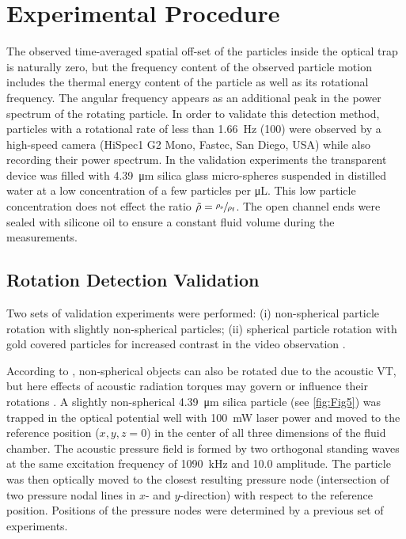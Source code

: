 \section{Experimental Procedure\label{sec:experimentalProcedure}}

The observed time-averaged spatial off-set of the particles inside the optical 
trap is naturally zero, but the frequency content of the observed particle 
motion includes the thermal energy content of the particle as well as its 
rotational frequency. The angular frequency appears as an additional peak in the 
power spectrum of the rotating particle. In order to validate this detection 
method, particles with a rotational rate of less than \SI{1.66}{\hertz} 
(\SI{100}{\rpm}) were observed by a high-speed camera (HiSpec1 G2 Mono, Fastec, 
San Diego, USA) while also recording their power spectrum.  In the validation 
experiments the transparent device was filled with \SI{4.39}{\micro\meter} 
silica glass micro-spheres suspended in distilled water at a low concentration 
of a few particles per \si{\micro\liter}.  This low particle concentration does 
not effect the ratio $\tilde{\rho} = \sfrac{\rho_{\text{s}}}{\rho_{\text{f}}}$. 
The open channel ends were sealed with silicone oil to ensure a constant fluid 
volume during the measurements.

\subsection{Rotation Detection 
Validation\label{sec:rotationDetectionValidation}}

Two sets of validation experiments were performed: (i) non-spherical particle 
rotation with slightly non-spherical particles; (ii) spherical particle rotation 
with gold covered particles for increased contrast in the video observation 
\cite{Lamprecht}. 

According to \citeauthor{hahn2016} \cite{hahn2016}, non-spherical objects can 
also be rotated due to the acoustic VT, but here effects of acoustic radiation 
torques may govern or influence their rotations \cite{wang2012time}. A slightly 
non-spherical \SI{4.39}{\micro\meter} silica particle (see \cref{fig:Fig5}) was 
trapped in the optical potential well with \SI{100}{\milli\watt} laser power and 
moved to the reference position ($x,y,z = 0$) in the center of all three 
dimensions of the fluid chamber. The acoustic pressure field is formed by two 
orthogonal standing waves at the same excitation frequency of 
\SI{1090}{\kilo\hertz} and \SI{10.0}{\Vrms} amplitude. The particle was then 
optically moved to the closest resulting pressure node (intersection of two 
pressure nodal lines in $x$- and $y$-direction) with respect to the reference 
position. Positions of the pressure nodes were determined by a previous set of 
experiments.

